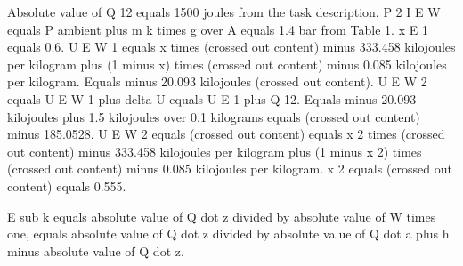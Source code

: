 Absolute value of Q 12 equals 1500 joules from the task description.  
P 2 I E W equals P ambient plus m k times g over A equals 1.4 bar from Table 1.  
x E 1 equals 0.6.  
U E W 1 equals x times (crossed out content) minus 333.458 kilojoules per kilogram plus (1 minus x) times (crossed out content) minus 0.085 kilojoules per kilogram.  
Equals minus 20.093 kilojoules (crossed out content).  
U E W 2 equals U E W 1 plus delta U equals U E 1 plus Q 12.  
Equals minus 20.093 kilojoules plus 1.5 kilojoules over 0.1 kilograms equals (crossed out content) minus 185.0528.  
U E W 2 equals (crossed out content) equals x 2 times (crossed out content) minus 333.458 kilojoules per kilogram plus (1 minus x 2) times (crossed out content) minus 0.085 kilojoules per kilogram.  
x 2 equals (crossed out content) equals 0.555.

E sub k equals absolute value of Q dot z divided by absolute value of W times one, equals absolute value of Q dot z divided by absolute value of Q dot a plus h minus absolute value of Q dot z.